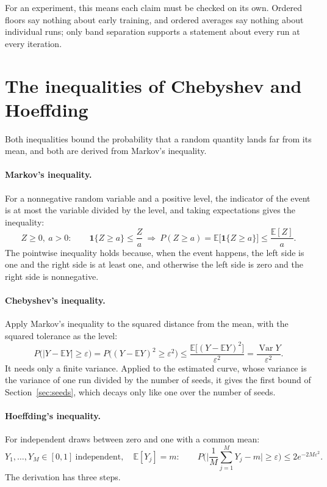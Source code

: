 \documentclass[11pt]{article}
\begin{document}
For an experiment, this means each claim must be checked on its own. Ordered floors say nothing about
early training, and ordered averages say nothing about individual runs; only band separation supports
a statement about every run at every iteration.

\section{The inequalities of Chebyshev and Hoeffding}
\label{sec:ineq}

Both inequalities bound the probability that a random quantity lands far from its mean, and both are
derived from Markov's inequality.

\paragraph{Markov's inequality.} For a nonnegative random variable and a positive level, the
indicator of the event is at most the variable divided by the level, and taking expectations gives
the inequality:
\[
  Z \ge 0, \ a > 0: \qquad \mathbf{1}\{Z \ge a\} \le \frac{Z}{a}
  \ \Longrightarrow\ P(Z \ge a) = \mathbb{E}\big[\mathbf{1}\{Z \ge a\}\big] \le \frac{\mathbb{E}[Z]}{a} .
\]
The pointwise inequality holds because, when the event happens, the left side is one and the right
side is at least one, and otherwise the left side is zero and the right side is nonnegative.

\paragraph{Chebyshev's inequality.} Apply Markov's inequality to the squared distance from the mean,
with the squared tolerance as the level:
\[
  P\big(|Y - \mathbb{E}Y| \ge \varepsilon\big) = P\big((Y - \mathbb{E}Y)^2 \ge \varepsilon^2\big)
  \le \frac{\mathbb{E}\big[(Y - \mathbb{E}Y)^2\big]}{\varepsilon^2} = \frac{\operatorname{Var} Y}{\varepsilon^2} .
\]
It needs only a finite variance. Applied to the estimated curve, whose variance is the variance of one
run divided by the number of seeds, it gives the first bound of Section~\ref{sec:seeds}, which decays
only like one over the number of seeds.

\paragraph{Hoeffding's inequality.} For independent draws between zero and one with a common mean:
\[
  Y_1, \dots, Y_M \in [0, 1] \ \text{independent}, \quad \mathbb{E}[Y_j] = m: \qquad
  P\Big(\Big|\frac{1}{M} \sum_{j=1}^{M} Y_j - m\Big| \ge \varepsilon\Big) \le 2 e^{-2 M \varepsilon^2} .
\]
The derivation has three steps.
\end{document}
